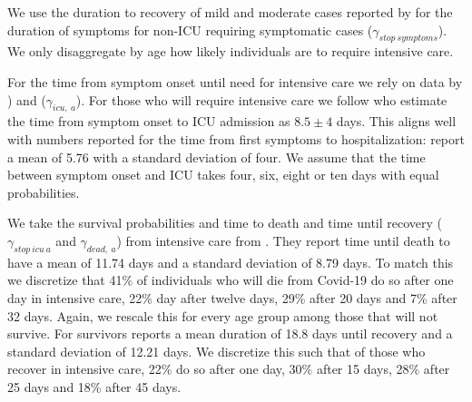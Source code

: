 
We use the duration to recovery of mild and moderate cases reported by \cite[Figure~S3,
Panel~2]{Bi2020} for the duration of symptoms for non-ICU requiring symptomatic cases
($\gamma_{stop\:symptoms}$). We only disaggregate by age how likely individuals
are to require intensive care. %

For the time from symptom onset until need for intensive care we rely on data by
\cite{Stokes2020}) and \cite{Hinch2021} ($\gamma_{icu,\:a}$). For those who will require
intensive care we follow \citet{Chen2020} who estimate the time from symptom onset to ICU
admission as $8.5 \pm 4$ days. This aligns well with numbers reported for the time from
first symptoms to hospitalization: \citet{Gaythorpe2020} report a mean of 5.76 with a
standard deviation of four. We assume that the time between symptom onset and ICU takes
four, six, eight or ten days with equal probabilities.

We take the survival probabilities and time to death and time until recovery
($\gamma_{stop\:icu\:a}$ and $\gamma_{dead,\:a}$) from intensive care from
\citet{Hinch2021}. They report time until death to have a mean of 11.74 days and a
standard deviation of 8.79 days. To match this we discretize that 41\% of individuals who
will die from Covid-19 do so after one day in intensive care, 22\% day after twelve days,
29\% after 20 days and 7\% after 32 days. Again, we rescale this for every age group
among those that will not survive. For survivors \cite{Hinch2020} reports a mean duration
of 18.8 days until recovery and a standard deviation of 12.21 days. We discretize this
such that of those who recover in intensive care, 22\% do so after one day, 30\% after 15
days, 28\% after 25 days and 18\% after 45 days.

\FloatBarrier
